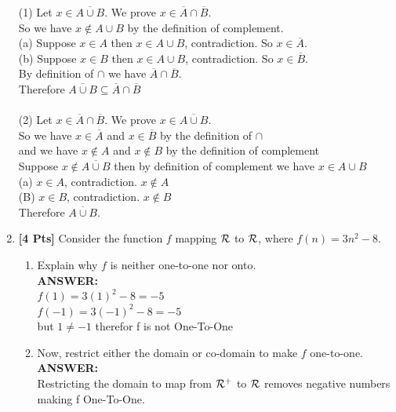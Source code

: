 \documentclass[12pt]{article}
\begin{document}
\begin{enumerate}
         (1) Let $x \in \overline{A \cup B}$. We prove $x \in \overline{A} \cap \overline{B}$.\\
         So we have $x \notin A \cup B$ by the definition of complement.\\
         	(a) Suppose $x \in A$ then $x \in A \cup B$, contradiction. So $x \in \overline{A}$.\\
	
		(b) Suppose $x \in B$ then $x \in A \cup B$, contradiction. So $x \in \overline{B}$.\\
	By definition of $\cap$ we have $\overline{A} \cap \overline{B}$.\\
	Therefore $\overline{A \cup B} \subseteq \overline{A} \cap \overline{B}$\\\\
				
	(2) Let $x \in \overline{A} \cap \overline{B}$. We prove $x \in \overline{A \cup B}$.\\
	So we have $x \in \overline{A}$ and $x \in \overline{B}$ by the definition of $\cap$\\
	and we have $x \notin A$ and $x \notin B$ by the definition of complement\\
	Suppose $x \notin \overline{A \cup B}$ then by definition of complement we have $x \in A \cup B$\\
		(a) $x \in A$, contradiction. $x \notin A$\\
		(B) $x \in B$, contradiction. $x \notin B$\\ 
	Therefore $\overline{A \cup B}$.\\
	
				
\clearpage
\item {\bf [4 Pts]} Consider the function $f$ mapping $\cal R$ to $\cal R$, where $f(n) = 3n^2 - 8$.

\begin{enumerate}
\item Explain why $f$ is neither one-to-one nor onto. \\
	\textbf{ANSWER:}\\
	$f(1) = 3(1)^2 - 8 = -5$\\
	$f(-1) = 3(-1)^2 - 8 = -5$\\
	but $1 \neq -1$ therefor f is not One-To-One\\
	
\item Now, restrict either the domain or co-domain to make $f$ one-to-one. \\
	\textbf{ANSWER:}\\
	Restricting the domain to map from $\cal R^+$ to $\cal R$ removes negative numbers making f One-To-One.  \\


\end{enumerate}
\end{enumerate}
\end{document}
